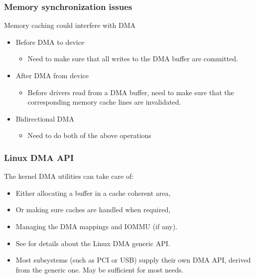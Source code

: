 \begin{frame}
  \frametitle{Memory synchronization issues}
  Memory caching could interfere with DMA
  \begin{itemize}
  \item Before DMA to device
    \begin{itemize}
    \item Need to make sure that all writes to the DMA buffer are
      committed.
    \end{itemize}
  \item After DMA from device
    \begin{itemize}
    \item Before drivers read from a DMA buffer, need to make sure
      that the corresponding memory cache lines are invalidated.
    \end{itemize}
  \item Bidirectional DMA
    \begin{itemize}
    \item Need to do both of the above operations
    \end{itemize}
  \end{itemize}
\end{frame}

\begin{frame}
  \frametitle{Linux DMA API}
  The kernel DMA utilities can take care of:
  \begin{itemize}
  \item Either allocating a buffer in a cache coherent area,
  \item Or making sure caches are handled when required,
  \item Managing the DMA mappings and IOMMU (if any).
  \item See  for details about the
    Linux DMA generic API.
  \item Most subsystems (such as PCI or USB) supply their own DMA
    API, derived from the generic one. May be sufficient for most
    needs.
  \end{itemize}
\end{frame}

